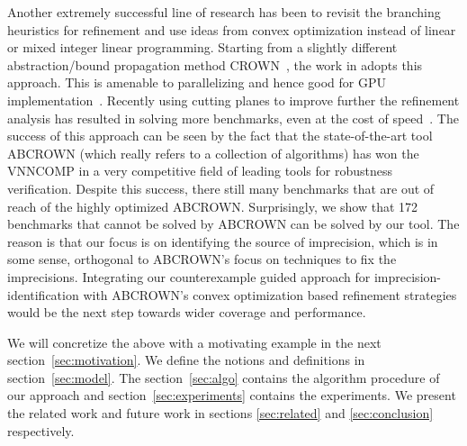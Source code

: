 Another extremely successful line of research has been to revisit the branching heuristics for refinement and use ideas from convex optimization instead of linear or mixed integer linear programming. Starting from a slightly different abstraction/bound propagation method CROWN~\cite{crown}, the work in \cite{betacrown} adopts this approach. This is amenable to parallelizing and hence good for GPU implementation~\cite{gpucrown}. Recently using cutting planes to improve further the refinement analysis has resulted in solving more benchmarks, even at the cost of speed~\cite{cutting-planes}. The success of this approach can be seen by the fact that the state-of-the-art tool ABCROWN (which really refers to a collection of algorithms) has won the VNNCOMP in a very competitive field of leading tools for robustness verification. Despite this success, there still many benchmarks that are out of reach of the highly optimized ABCROWN. Surprisingly, we show that 172 benchmarks that cannot be solved by ABCROWN can be solved by our tool. The reason is that our focus is on identifying the source of imprecision, which is in some sense, orthogonal to ABCROWN's focus on techniques to fix the imprecisions. Integrating our counterexample guided approach for imprecision-identification with ABCROWN's convex optimization based refinement strategies would be the next step towards wider coverage and performance. %





We will concretize the above with a motivating example in the next section~\ref{sec:motivation}.  We define the notions and definitions in section~\ref{sec:model}. The section~\ref{sec:algo} contains the 
algorithm procedure of our approach and section~\ref{sec:experiments} contains the experiments. 
We present the related work and future work in sections \ref{sec:related} and \ref{sec:conclusion} respectively. 




